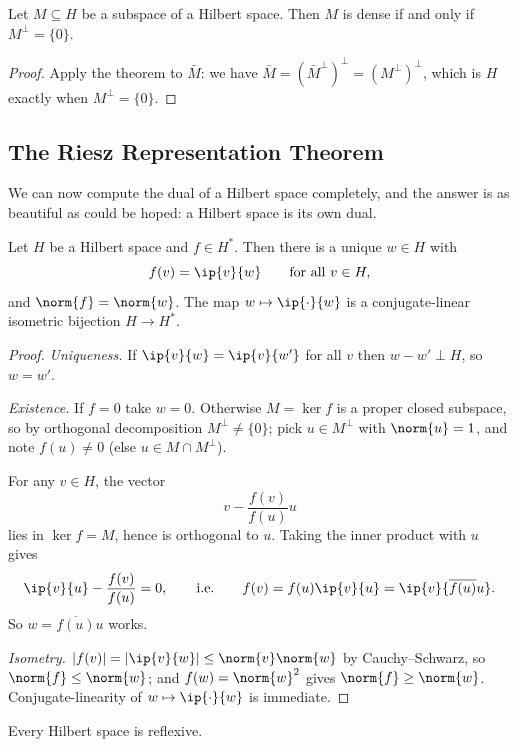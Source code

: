 \begin{corollary}
	Let $M \subseteq H$ be a subspace of a Hilbert space. Then $M$ is dense if and only if $M^\perp = \{0\}$.
\end{corollary}

\begin{proof}
	Apply the theorem to $\bar M$: we have $\bar M = (\bar M^\perp)^\perp = (M^\perp)^\perp$, which is $H$ exactly when $M^\perp = \{0\}$.
\end{proof}

\subsection{The Riesz Representation Theorem}

We can now compute the dual of a Hilbert space completely, and the answer is as beautiful as could be hoped: a Hilbert space is its own dual.

\begin{theorem}
	Let $H$ be a Hilbert space and $f \in H^*$. Then there is a unique $w \in H$ with
	$$f(v) = \ip{v}{w} \qquad \text{for all } v \in H,$$
	and $\norm{f} = \norm{w}$. The map $w \mapsto \ip{\cdot}{w}$ is a conjugate-linear isometric bijection $H \to H^*$.
\end{theorem}

\begin{proof}
	\emph{Uniqueness.} If $\ip{v}{w} = \ip{v}{w'}$ for all $v$ then $w - w' \perp H$, so $w = w'$.

	\emph{Existence.} If $f = 0$ take $w = 0$. Otherwise $M = \ker f$ is a proper closed subspace, so by orthogonal decomposition $M^\perp \neq \{0\}$; pick $u \in M^\perp$ with $\norm{u}=1$, and note $f(u)\neq 0$ (else $u \in M \cap M^\perp$).

	For any $v \in H$, the vector
	$$v - \frac{f(v)}{f(u)}u$$
	lies in $\ker f = M$, hence is orthogonal to $u$. Taking the inner product with $u$ gives
	$$\ip{v}{u} - \frac{f(v)}{f(u)} = 0, \qquad \text{i.e.}\qquad f(v) = f(u)\ip{v}{u} = \ip{v}{\overline{f(u)}u}.$$
	So $w = \overline{f(u)}u$ works.

	\emph{Isometry.} $|f(v)| = |\ip{v}{w}| \leq \norm{v}\norm{w}$ by Cauchy--Schwarz, so $\norm{f}\leq\norm{w}$; and $f(w) = \norm{w}^2$ gives $\norm{f}\geq\norm{w}$. Conjugate-linearity of $w \mapsto \ip{\cdot}{w}$ is immediate.
\end{proof}

\begin{corollary}
	Every Hilbert space is reflexive.
\end{corollary}

